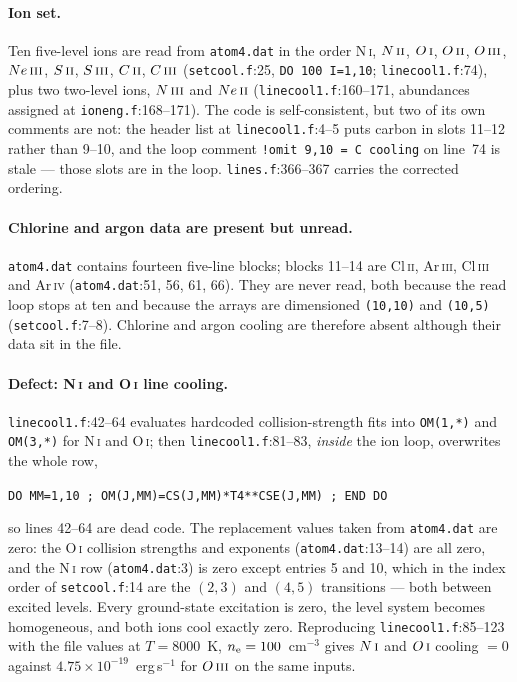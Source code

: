 \documentclass[english,a4paper]{my_memo}
\newcommand{\code}[1]{\texttt{#1}}
\newcommand{\OI}{O\,\textsc{i}}
\newcommand{\OII}{O\,\textsc{ii}}
\newcommand{\OIII}{O\,\textsc{iii}}
\newcommand{\NI}{N\,\textsc{i}}
\newcommand{\NII}{N\,\textsc{ii}}
\newcommand{\NIII}{N\,\textsc{iii}}
\newcommand{\CII}{C\,\textsc{ii}}
\newcommand{\CIII}{C\,\textsc{iii}}
\newcommand{\SII}{S\,\textsc{ii}}
\newcommand{\SIII}{S\,\textsc{iii}}
\newcommand{\NeII}{Ne\,\textsc{ii}}
\newcommand{\NeIII}{Ne\,\textsc{iii}}
\newcommand{\nel}{n_{\rm e}}
\begin{document}
\paragraph{Ion set.}  Ten five-level ions are read from \code{atom4.dat} in the
order N\,\textsc{i}, $\NII{}$, $\OI{}$, $\OII{}$, $\OIII{}$, $\NeIII{}$,
$\SII{}$, $\SIII{}$, $\CII{}$, $\CIII{}$ (\code{setcool.f}:25,
\code{DO 100 I=1,10}; \code{linecool1.f}:74), plus two two-level ions,
$\NIII{}$ and $\NeII{}$ (\code{linecool1.f}:160--171, abundances assigned at
\code{ioneng.f}:168--171).  The code is self-consistent, but two of its own
comments are not: the header list at \code{linecool1.f}:4--5 puts carbon in
slots 11--12 rather than 9--10, and the loop comment
\code{!omit 9,10 = C cooling} on line~74 is stale --- those slots are in the
loop.  \code{lines.f}:366--367 carries the corrected ordering.

\paragraph{Chlorine and argon data are present but unread.}
\code{atom4.dat} contains fourteen five-line blocks; blocks 11--14 are
Cl\,\textsc{ii}, Ar\,\textsc{iii}, Cl\,\textsc{iii} and Ar\,\textsc{iv}
(\code{atom4.dat}:51, 56, 61, 66).  They are never read, both because the read
loop stops at ten and because the arrays are dimensioned \code{(10,10)} and
\code{(10,5)} (\code{setcool.f}:7--8).  Chlorine and argon cooling are
therefore absent although their data sit in the file.

\paragraph{Defect: \NI{} and \OI{} line cooling.}
\code{linecool1.f}:42--64 evaluates hardcoded collision-strength fits into
\code{OM(1,*)} and \code{OM(3,*)} for \NI{} and \OI{}; then
\code{linecool1.f}:81--83, \emph{inside} the ion loop, overwrites the whole row,
\begin{center}
\code{DO MM=1,10 ; OM(J,MM)=CS(J,MM)*T4**CSE(J,MM) ; END DO}
\end{center}
so lines 42--64 are dead code.  The replacement values taken from
\code{atom4.dat} are zero: the \OI{} collision strengths and exponents
(\code{atom4.dat}:13--14) are all zero, and the \NI{} row
(\code{atom4.dat}:3) is zero except entries 5 and 10, which in the index order
of \code{setcool.f}:14 are the $(2,3)$ and $(4,5)$ transitions --- both between
excited levels.  Every ground-state excitation is zero, the level system
becomes homogeneous, and both ions cool exactly zero.  Reproducing
\code{linecool1.f}:85--123 with the file values at $T = 8000$~K,
$\nel = 100$~cm$^{-3}$ gives $\NI{}$ and $\OI{}$ cooling $= 0$ against
$4.75\times10^{-19}$~erg\,s$^{-1}$ for $\OIII{}$ on the same inputs.
\end{document}
